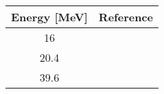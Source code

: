 \begin{tabular}{|c||c|} 
    \hline 
    \bf{Energy [MeV]} & \bf{Reference} \\
    \hline
    \hline 
    16 & \cite{Abbott87}\\
    20.4 & \cite{Wassenaar89}\\
    39.6 & \cite{Boyd68}\\
    \hline
\end{tabular}
